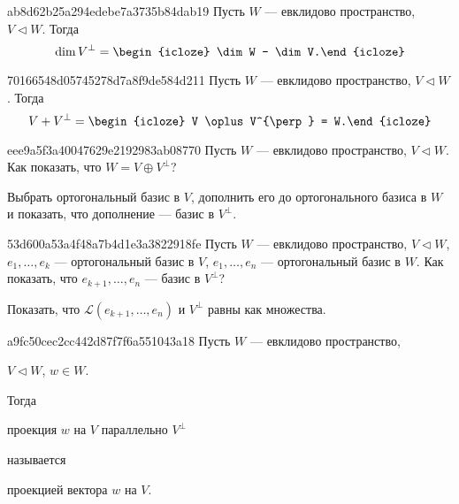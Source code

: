 \begin{note}{ab8d62b25a294edebe7a3735b84dab19}
    Пусть \({ W }\) --- евклидово пространство, \({ V \triangleleft W }\).
    Тогда
    \[
        \dim V^{\perp} = \begin{icloze}{1}\dim W - \dim V.\end{icloze}
    \]
\end{note}

\begin{note}{70166548d05745278d7a8f9de584d211}
    Пусть \({ W }\) --- евклидово пространство, \({ V \triangleleft W }\).
    Тогда
    \[
        V + V^{\perp} = \begin{icloze}{1}V \oplus V^{\perp} = W.\end{icloze}
    \]
\end{note}

\begin{note}{eee9a5f3a40047629e2192983ab08770}
    Пусть \({ W }\) --- евклидово пространство, \({ V \triangleleft W }\).
    Как показать, что \({ W = V \oplus V^{\perp} }\)?

    \begin{cloze}{1}
        Выбрать ортогональный базис в \({ V }\), дополнить его до ортогонального базиса в \({ W }\) и показать, что дополнение --- базис в \({ V^{\perp} }\).
    \end{cloze}
\end{note}

\begin{note}{53d600a53a4f48a7b4d1e3a3822918fe}
    Пусть \({ W }\) --- евклидово пространство, \({ V \triangleleft W }\),
    \({ e_1, \ldots, e_k }\) --- ортогональный базис в \({ V }\), \({ e_1, \ldots, e_n }\) --- ортогональный базис в \({ W }\).
    Как показать, что \({ e_{k + 1}, \ldots, e_n }\) --- базис в \({ V^{\perp} }\)?

    \begin{cloze}{1}
        Показать, что \({ \mathscr L (e_{k + 1}, \ldots, e_n) }\) и \({ V^{\perp} }\) равны как множества.
    \end{cloze}
\end{note}

\begin{note}{a9fc50cec2cc442d87f7f6a551043a18}
    Пусть \({ W }\) --- евклидово пространство, \begin{icloze}{3}\({ V \triangleleft W }\), \({ w \in W }\).\end{icloze}
    Тогда \begin{icloze}{1}проекция \({ w }\) на \({ V }\) параллельно \({ V^{\perp} }\)\end{icloze} называется \begin{icloze}{2}проекцией вектора \({ w }\) на \({ V }\).\end{icloze}
\end{note}

